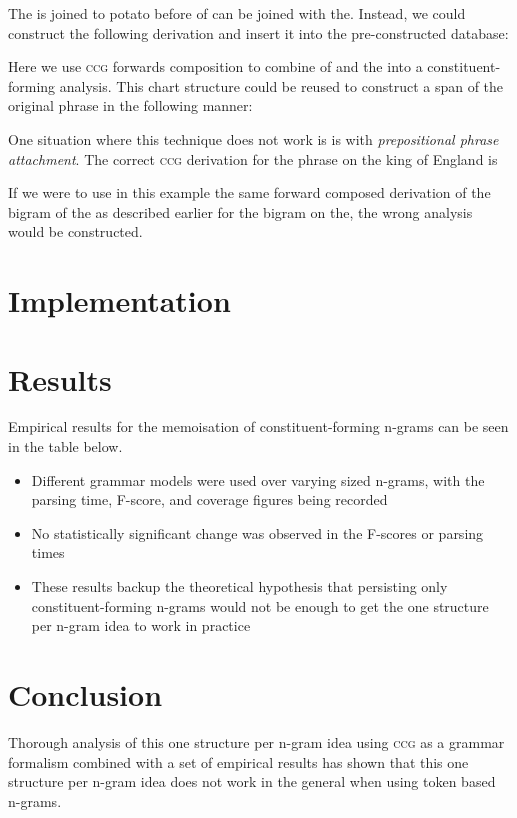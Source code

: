 \documentclass[landscape]{usydposter}
\newcommand{\acronym}[1]{\textsc{#1}\xspace}
\newcommand{\ngram}{n-gram\xspace}
\newcommand{\ngrams}{{\ngram}s\xspace}
\newcommand{\ccg}{\acronym{ccg}}
\begin{document}
\begin{multicols}{3}
\textrm{The} is joined to \textrm{potato} before \textrm{of} can be joined with \textrm{the}. Instead, we could construct the following derivation and insert it into the pre-constructed database:

Here we use \ccg forwards composition to combine \textrm{of} and \textrm{the} into a constituent-forming analysis. This chart structure could be reused to construct a span of the original phrase in the following manner:

One situation where this technique does not work is is with \emph{prepositional phrase attachment}. The correct \ccg derivation for the phrase \textrm{on the king of England} is

If we were to use in this example the same forward composed derivation of the bigram \textrm{of the} as described earlier for the bigram \textrm{on the}, the wrong analysis would be constructed.

\section{Implementation}

\section{Results}
Empirical results for the memoisation of constituent-forming \ngrams can be seen in the table below.

\begin{itemize}
  \item Different grammar models were used over varying sized \ngrams, with the  parsing time, F-score, and coverage figures being recorded
  \item No statistically significant change was observed in the F-scores or parsing times
  \item These results backup the theoretical hypothesis that persisting only constituent-forming \ngrams would not be enough to get the one structure per \ngram idea to work in practice
\end{itemize}

\section{Conclusion}
Thorough analysis of this one structure per \ngram idea using \ccg as a grammar formalism combined with a set of empirical results has shown that this one structure per \ngram idea does not work in the general when using token based \ngrams. 


\end{multicols}
\end{document}
